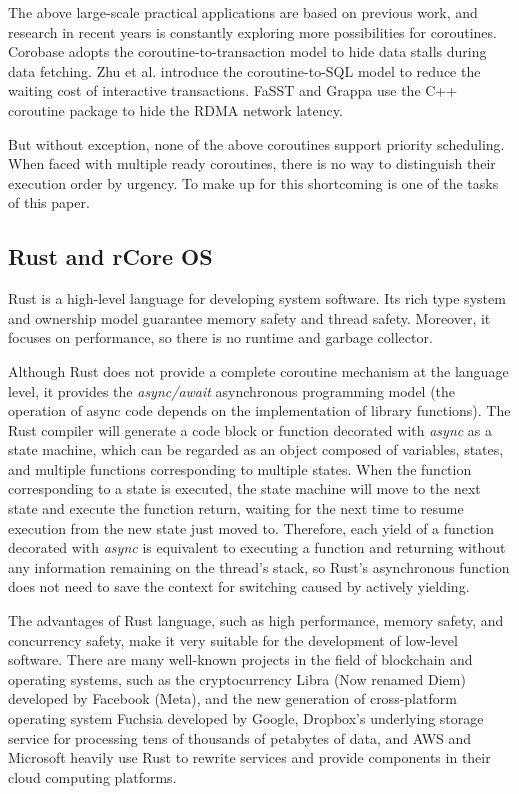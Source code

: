 \documentclass[10pt]{article}
\begin{document}
The above large-scale practical applications are based on previous work, and research in recent years is constantly exploring more possibilities for coroutines. Corobase \cite{he2020corobase} adopts the coroutine-to-transaction model to hide data stalls during data fetching. Zhu et al. \cite{zhu2018interactive} introduce the coroutine-to-SQL model to reduce the waiting cost of interactive transactions. FaSST \cite{kalia2016fasst} and Grappa \cite{nelson2015latency} use the C++ coroutine package to hide the RDMA network latency.

But without exception, none of the above coroutines support priority scheduling. When faced with multiple ready coroutines, there is no way to distinguish their execution order by urgency. To make up for this shortcoming is one of the tasks of this paper.

\subsection{Rust and rCore OS}

Rust is a high-level language for developing system software. Its rich type system and ownership model guarantee memory safety and thread safety. Moreover, it focuses on performance, so there is no runtime and garbage collector.

Although Rust does not provide a complete coroutine mechanism at the language level, it provides the \textit{async/await} asynchronous programming model \cite{cutner2021safe} (the operation of async code depends on the implementation of library functions). The Rust compiler will generate a code block or function decorated with \textit{async} as a state machine, which can be regarded as an object composed of variables, states, and multiple functions corresponding to multiple states. When the function corresponding to a state is executed, the state machine will move to the next state and execute the function return, waiting for the next time to resume execution from the new state just moved to. Therefore, each yield of a function decorated with \textit{async} is equivalent to executing a function and returning without any information remaining on the thread's stack, so Rust's asynchronous function does not need to save the context for switching caused by actively yielding.

The advantages of Rust language, such as high performance, memory safety, and concurrency safety, make it very suitable for the development of low-level software. There are many well-known projects in the field of blockchain and operating systems, such as the cryptocurrency Libra (Now renamed Diem) developed by Facebook (Meta), and the new generation of cross-platform operating system Fuchsia developed by Google, Dropbox's underlying storage service \cite{jayakar2020rewriting} for processing tens of thousands of petabytes of data, and AWS \cite{Amozon} and Microsoft \cite{Fibers} heavily use Rust to rewrite services and provide components in their cloud computing platforms.
\end{document}
